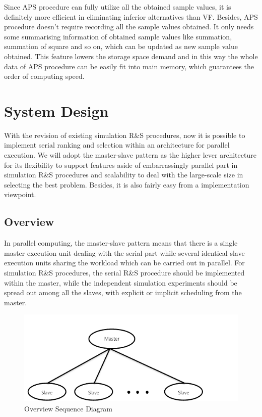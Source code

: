 Since APS procedure can fully utilize all the obtained sample values, it is definitely more efficient in eliminating inferior alternatives than VF. Besides, APS procedure doesn't require recording all the sample values obtained. It only needs some summarising information of obtained sample values like summation, summation of square and so on, which can be updated as new sample value obtained. This feature lowers the storage space demand and in this way the whole data of APS procedure can be easily fit into main memory, which guarantees the order of computing speed.

\section{System Design}

With the revision of existing simulation R\&S procedures, now it is possible to implement serial ranking and selection within an architecture for parallel execution. We will adopt the master-slave pattern as the higher lever architecture for its flexibility to support features aside of embarrassingly parallel part in simulation R\&S procedures and scalability to deal with the large-scale size in selecting the best problem. Besides, it is also fairly easy from a implementation viewpoint.

\subsection{Overview}

In parallel computing, the master-slave pattern means that there is a single master execution unit dealing with the serial part while several identical slave execution units sharing the workload which can be carried out in parallel. For simulation R\&S procedures, the serial R\&S procedure should be implemented within the master, while the independent simulation experiments should be spread out among all the slaves, with explicit or implicit scheduling from the master.

\begin{figure}[ht]
\centering
\includegraphics[width=120mm]{master-slave-brief.png}
\caption{Overview Sequence Diagram}
\end{figure}

